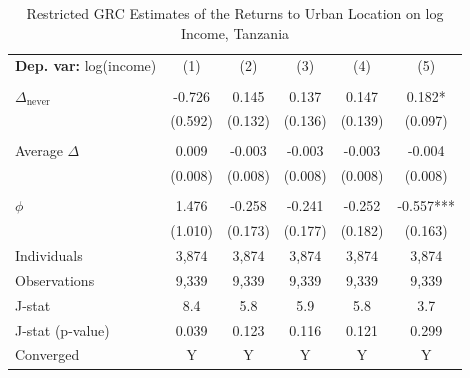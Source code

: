 \begin{table}[htbp] \centering \begin{threeparttable}
 \caption{Restricted GRC Estimates of the Returns to Urban Location on log Income, Tanzania} 
 \label{tab:GRC_TZA_income_urban_unb} 
\begin{tabular}{l ccccc} \toprule  \textbf{Dep. var:}  log(income) 
                    &\multicolumn{1}{c}{(1)}   &\multicolumn{1}{c}{(2)}   &\multicolumn{1}{c}{(3)}   &\multicolumn{1}{c}{(4)}   &\multicolumn{1}{c}{(5)}   \\
                    &               &               &               &               &               \\
\addlinespace
$\Delta_{\text{never}}$&      -0.726   &       0.145   &       0.137   &       0.147   &       0.182*  \\
                    &     (0.592)   &     (0.132)   &     (0.136)   &     (0.139)   &     (0.097)   \\
                    &               &               &               &               &               \\
\addlinespace
Average $\Delta$    &       0.009   &      -0.003   &      -0.003   &      -0.003   &      -0.004   \\
                    &     (0.008)   &     (0.008)   &     (0.008)   &     (0.008)   &     (0.008)   \\
                    &               &               &               &               &               \\
\addlinespace
$\phi$              &       1.476   &      -0.258   &      -0.241   &      -0.252   &      -0.557***\\
                    &     (1.010)   &     (0.173)   &     (0.177)   &     (0.182)   &     (0.163)   \\
\addlinespace
Individuals         &       3,874   &       3,874   &       3,874   &       3,874   &       3,874   \\
Observations        &       9,339   &       9,339   &       9,339   &       9,339   &       9,339   \\
J-stat              &         8.4   &         5.8   &         5.9   &         5.8   &         3.7   \\
J-stat (p-value)    &       0.039   &       0.123   &       0.116   &       0.121   &       0.299   \\
Converged           &           Y   &           Y   &           Y   &           Y   &           Y   \\

\end{tabular}
\end{threeparttable}
\end{table}
